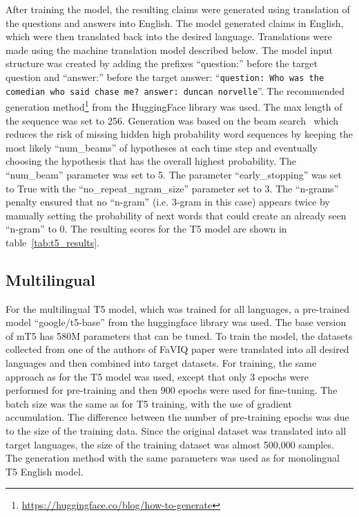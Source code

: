 After training the model, the resulting claims were generated using translation of the questions and answers into English. The model generated claims in English, which were then translated back into the desired language. Translations were made using the machine translation model described below. The model input structure was created by adding the prefixes ``question:'' before the target question and ``answer:'' before the target answer: ``\texttt{question: Who was the comedian who said chase me? answer: duncan norvelle}''. The recommended generation method\footnote{\url{https://huggingface.co/blog/how-to-generate}} from the HuggingFace library was used. The max length of the sequence was set to 256. Generation was based on the beam search~\cite{beamsearch} which reduces the risk of missing hidden high probability word sequences by keeping the most likely ``num\_beams'' of hypotheses at each time step and eventually choosing the hypothesis that has the overall highest probability. The ``num\_beam'' parameter was set to 5. The parameter ``early\_stopping'' was set to True with the ``no\_repeat\_ngram\_size'' parameter set to 3. The ``n-grams'' penalty ensured that no ``n-gram'' (i.e. 3-gram in this case) appears twice by manually setting the probability of next words that could create an already seen ``n-gram'' to 0. The resulting scores for the T5 model are shown in table~\ref{tab:t5_results}.

\subsection*{Multilingual}
For the multilingual T5 model, which was trained for all languages, a pre-trained model ``google/t5-base'' from the huggingface library was used. The base version of mT5 has 580M parameters that can be tuned. To train the model, the datasets collected from one of the authors of FaVIQ paper were translated into all desired languages and then combined into target datasets. 
For training, the same approach as for the T5 model was used, except that only 3 epochs were performed for pre-training and then 900 epochs were used for fine-tuning. The batch size was the same as for T5 training, with the use of gradient accumulation. The difference between the number of pre-training epochs was due to the size of the training data. Since the original dataset was translated into all target languages, the size of the training dataset was almost 500,000 samples. The generation method with the same parameters was used as for monolingual T5 English model.

